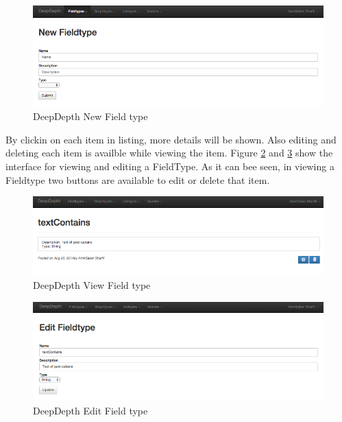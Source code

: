 \documentclass[a4paper,11pt]{report}
\begin{document}
\begin{figure}[H!]
\begin{center}
\includegraphics[scale=0.5]{dd_newfieldtype.png}
\end{center}
\caption{DeepDepth New Field type}
\label{fig:dd_newfieldtype}
\end{figure}

By clickin on each item in listing, more details will be shown. Also editing and deleting each item is availble while viewing the item. Figure \ref{fig:dd_viewfieldtype} and \ref{fig:dd_editfieldtype} show the interface for viewing and editing a FieldType. As it can bee seen, in viewing a Fieldtype two buttons are available to edit or delete that item.

\begin{figure}[H!]
\begin{center}
\includegraphics[scale=0.5]{dd_viewfieldtype.png}
\end{center}
\caption{DeepDepth View Field type}
\label{fig:dd_viewfieldtype}
\end{figure}

\begin{figure}[H!]
\begin{center}
\includegraphics[scale=0.5]{dd_editfieldtype.png}
\end{center}
\caption{DeepDepth Edit Field type}
\label{fig:dd_editfieldtype}
\end{figure}
\end{document}
